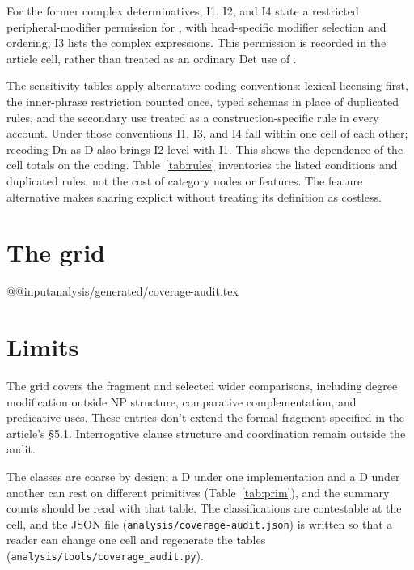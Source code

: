 \documentclass[12pt]{article}
\makeatletter
\newcommand{\tablebody}[1]{\csname @@input\endcsname #1 }
\makeatother
\begin{document}
For the former complex determinatives, I1, I2, and I4 state a restricted peripheral-modifier permission for , with head-specific modifier selection and ordering; I3 lists the complex expressions. This permission is recorded in the article cell, rather than treated as an ordinary Det use of .

The sensitivity tables apply alternative coding conventions: lexical licensing first, the inner-phrase restriction counted once, typed schemas in place of duplicated rules, and the secondary use treated as a construction-specific rule in every account. Under those conventions I1, I3, and I4 fall within one cell of each other; recoding Dn as D also brings I2 level with I1. This shows the dependence of the cell totals on the coding. Table~\ref{tab:rules} inventories the listed conditions and duplicated rules, not the cost of category nodes or features. The feature alternative makes sharing explicit without treating its definition as costless.

\section{The grid}

\tablebody{analysis/generated/coverage-audit.tex}

\section{Limits}

The grid covers the fragment and selected wider comparisons, including degree modification outside NP structure, comparative complementation, and predicative uses. These entries don't extend the formal fragment specified in the article's §5.1. Interrogative clause structure and coordination remain outside the audit.

The classes are coarse by design; a D under one implementation and a D under another can rest on different primitives (Table~\ref{tab:prim}), and the summary counts should be read with that table. The classifications are contestable at the cell, and the JSON file (\texttt{analysis/coverage-audit.json}) is written so that a reader can change one cell and regenerate the tables (\texttt{analysis/tools/coverage\_audit.py}).

\printbibliography
\end{document}
